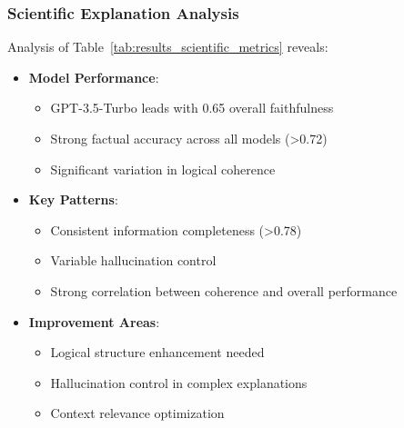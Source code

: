 \subsubsection{Scientific Explanation Analysis}
Analysis of Table~\ref{tab:results_scientific_metrics} reveals:
\begin{itemize}
    \item \textbf{Model Performance}:
    \begin{itemize}
        \item GPT-3.5-Turbo leads with 0.65 overall faithfulness
        \item Strong factual accuracy across all models (>0.72)
        \item Significant variation in logical coherence
    \end{itemize}
    \vspace{0.5em}
    \item \textbf{Key Patterns}:
    \begin{itemize}
        \item Consistent information completeness (>0.78)
        \item Variable hallucination control
        \item Strong correlation between coherence and overall performance
    \end{itemize}
    \vspace{0.5em}
    \item \textbf{Improvement Areas}:
    \begin{itemize}
        \item Logical structure enhancement needed
        \item Hallucination control in complex explanations
        \item Context relevance optimization
    \end{itemize}
\end{itemize}

